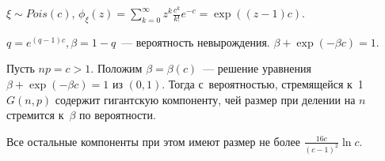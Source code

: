 \documentclass{article}
\begin{document}
\begin{example}
	$\xi \sim Pois(c)$, $\phi_\xi(z) = \sum\limits_{k=0}^\infty z^k \frac{c^k}{k!} e^{-c} =
	\exp((z-1)c)$.

	$q = e^{(q-1)c}, \beta = 1 - q$~--- вероятность невырождения. $\beta + \exp(-\beta c) = 1$.
\end{example}

\begin{theorem}
	Пусть $np = c > 1$. Положим $\beta = \beta(c)$~--- решение уравнения $\beta + \exp(-\beta c) = 1$
	из $(0, 1)$. Тогда с~вероятностью, стремящейся к~1 $G(n, p)$ содержит гигантскую компоненту, чей
	размер при делении на $n$ стремится к~$\beta$ по вероятности.

	Все остальные компоненты при этом имеют размер не более $\frac{16c}{(c-1)^2} \ln c$.
\end{theorem}
\end{document}
